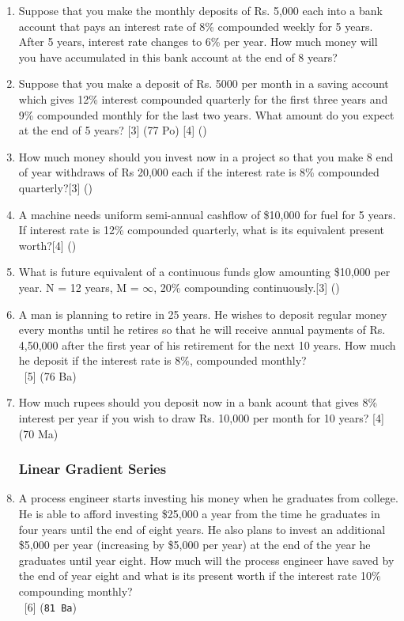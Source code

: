 \documentclass[12pt]{article}
\newcommand{\enter}{\\\textcolor{white}{1}}
\begin{document}
\begin{enumerate}[noitemsep, topsep=0pt]
			\item Suppose that you make the monthly deposits of Rs. 5,000 each into a bank account that pays an interest rate of 8\% compounded weekly for 5 years. After 5 years, interest rate changes to 6\% per year. How much money will you have accumulated in this bank account at the end of 8 years?

			\item Suppose that you make a deposit of Rs. 5000 per month in a saving account which gives 12\% interest compounded quarterly for the first three years and 9\% compounded monthly for the last two years. What amount do you expect at the end of 5 years? \hfill [3] (77 Po) [4] ()

			\item How much money should you invest now in a project so that you make 8 end of year withdraws of Rs 20,000 each if the interest rate is 8\% compounded quarterly?\hfill[3] ()

			\item A machine needs uniform semi-annual cashflow of \$10,000 for fuel for 5 years. If interest rate is 12\% compounded quarterly, what is its equivalent present worth?\hfill[4] ()

			\item What is future equivalent of a continuous funds glow amounting \$10,000 per year. N = 12 years, M = $\infty$, 20\% compounding continuously.\hfill[3] ()

			\item A man is planning to retire in 25 years. He wishes to deposit regular money every months until he retires so that he will receive annual payments of Rs. 4,50,000 after the first year of his retirement for the next 10 years. How much he deposit if the interest rate is 8\%, compounded monthly?
			\enter\hfill[5] (76 Ba)

			\item How much rupees should you deposit now in a bank acount that gives 8\% interest per year if you wish to draw Rs. 10,000 per month for 10 years? \hfill [4] (70 Ma)
		\subsubsection{Linear Gradient Series}

			\item A process engineer starts investing his money when he graduates from college. He is able to afford investing \$25,000 a year from the time he graduates in four years until the end of eight years. He also plans to invest an additional \$5,000 per year (increasing by \$5,000 per year) at the end of the year he graduates until year eight. How much will the process engineer have saved by the end of year eight and what is its present worth if the interest rate 10\% compounding monthly?
			\enter\hfill [6] (\texttt{81 Ba})


\end{enumerate}
\end{document}
